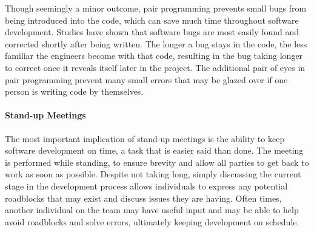 Though seemingly a minor outcome, pair programming prevents small bugs from being introduced into the code, which can save much time throughout software development.
Studies have shown that software bugs are most easily found and corrected shortly after being written.
The longer a bug stays in the code, the less familiar the engineers become with that code, resulting in the bug taking longer to correct once it reveals itself later in the project.
The additional pair of eyes in pair programming prevent many small errors that may be glazed over if one person is writing code by themselves.
\paragraph{Stand-up Meetings}
The most important implication of stand-up meetings is the ability to keep software development on time, a task that is easier said than done.
The meeting is performed while standing, to ensure brevity and allow all parties to get back to work as soon as possible.
Despite not taking long, simply discussing the current stage in the development process allows individuals to express any potential roadblocks that may exist and discuss issues they are having.
Often times, another individual on the team may have useful input and may be able to help avoid roadblocks and solve errors, ultimately keeping development on schedule. 